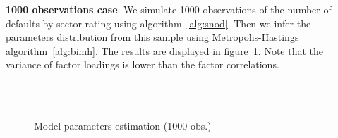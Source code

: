 \documentclass[11pt,fleqn]{book} %
\begin{document}
\begin{example}
	\textbf{1000 observations case}. We simulate 1000 observations of the number 
	of defaults by sector-rating using algorithm~\ref{alg:snod}. Then we infer 
	the parameters distribution from this sample using Metropolis-Hastings 
	algorithm~\ref{alg:bimh}. The results are displayed in 
	figure~\ref{fig:calib1}. Note that the variance of factor loadings is 
	lower than the factor correlations.
	\begin{figure}[!ht]
		\centering
		\hfill
		\\
		\\
		\caption{Model parameters estimation (1000 obs.)}
		\label{fig:calib1}
	\end{figure}


\end{example}
\end{document}
